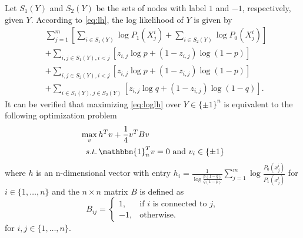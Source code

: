 \documentclass[conference]{IEEEtran}
\begin{document}
	Let $S_1(Y)$ and $S_2(Y)$ be the sets of nodes with label $1$ and $-1$, respectively, given $Y$.
	According to \eqref{eq:lh}, the log likelihood of $Y$ is given by
	\begin{align}\label{eq:loglh}
		&\sum^m_{j=1}[\sum_{i\in S_1(Y)} \log P_1(X^i_{j})+\sum_{i\in S_2(Y)} \log P_0(X^i_{j})]\nonumber\\
		&+\sum_{i,j\in S_1(Y),i<j}[z_{i,j}\log p+(1-z_{i,j})\log (1-p)]\nonumber\\
		&+\sum_{i,j\in S_2(Y),i<j}[z_{i,j}\log p+(1-z_{i,j})\log (1-p)]
		\nonumber\\
		&+\sum_{i\in S_1(Y),j\in S_2(Y)}[z_{i,j}\log q+(1-z_{i,j})\log (1-q)].
	\end{align}
	It can be verified that maximizing \eqref{eq:loglh} over $Y\in\{\pm 1\}^n$ is equivalent to the following optimization problem
	\begin{align}
		\max_{v}\, & h^T v + \frac{1}{4}v^T B v \notag \\
		s.t.\, & \mathbbm{1}_n^T v = 0 \text{ and } v_i \in \{\pm 1 \} \label{eq:matrix_mle}
	\end{align}
	where $h$ is an n-dimensional vector with entry $h_i = \frac{1}{\log \frac{p(1-q)}{q(1-p)}}\sum_{j=1}^m \log \frac{P_0(x^i_{j})}{P_1(x^i_{j})}$ for $i\in\{1,\ldots,n\}$ and the $n\times n $ matrix $B$ is defined as
	\begin{equation}
		B_{ij} = \begin{cases}
			1, & \text{if $i$ is connected to $j$}, \\
			-1,& \text{otherwise.}
		\end{cases}
	\end{equation}  
	for $i,j\in\{1,\ldots,n\}$.
	
\end{document}
